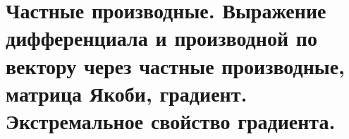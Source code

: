 \documentclass[../main.tex]{subfiles}
\begin{document}
\newpage
\section{Частные производные. Выражение дифференциала и производной по вектору через частные производные, матрица Якоби, градиент. Экстремальное свойство градиента.}
\end{document}
